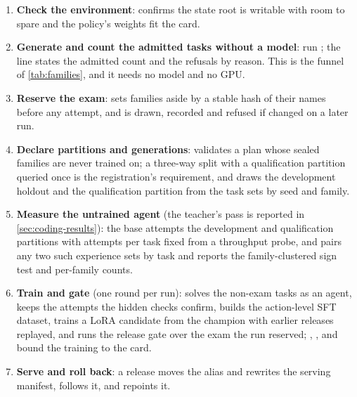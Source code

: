 \begin{enumerate}
\item \textbf{Check the environment}:  confirms the state
root is writable with room to spare and the policy's weights fit the card.
\item \textbf{Generate and count the admitted tasks without a model}: run
; the \code{[tasks]} line states the admitted count
and the refusals by reason. This is the funnel of \cref{tab:families}, and it needs no model and
no GPU.
\item \textbf{Reserve the exam}:  sets families aside by a
stable hash of their names before any attempt, and  is drawn, recorded and
refused if changed on a later run.
\item \textbf{Declare partitions and generations}:  validates a plan whose sealed
families are never trained on; a three-way split with a qualification partition queried once
is the registration's requirement, and 
draws the development holdout and the qualification partition from the task sets by seed and
family.
\item \textbf{Measure the untrained agent} (the teacher's pass is reported in \cref{sec:coding-results}): the base attempts the development and
qualification partitions with attempts per task fixed from a throughput probe, and
 pairs any two such experience sets
by task and reports the family-clustered sign test and per-family counts.
\item \textbf{Train and gate} (one round per run):  solves the
non-exam tasks as an agent, keeps the attempts the hidden checks confirm, builds the
action-level SFT dataset, trains a LoRA candidate from the champion with earlier releases
replayed, and runs the release gate over the exam the run reserved; ,
,  and  bound the training to the card.
\item \textbf{Serve and roll back}: a release moves the alias and rewrites the
serving manifest,  follows it, and 
repoints it.
\end{enumerate}

